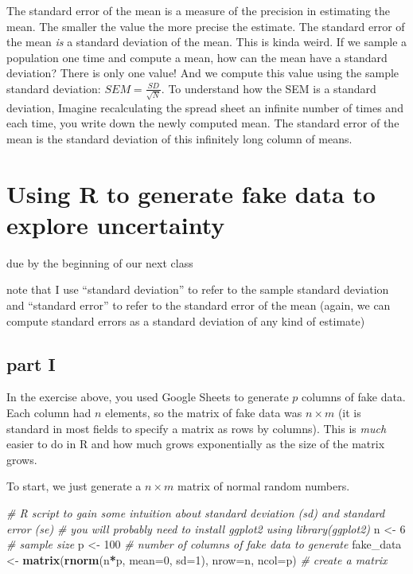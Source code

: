 \documentclass[]{book}
\newenvironment{Shaded}{\begin{snugshade}}{\end{snugshade}}
\newcommand{\KeywordTok}[1]{\textcolor[rgb]{0.13,0.29,0.53}{\textbf{#1}}}
\newcommand{\DataTypeTok}[1]{\textcolor[rgb]{0.13,0.29,0.53}{#1}}
\newcommand{\DecValTok}[1]{\textcolor[rgb]{0.00,0.00,0.81}{#1}}
\newcommand{\StringTok}[1]{\textcolor[rgb]{0.31,0.60,0.02}{#1}}
\newcommand{\CommentTok}[1]{\textcolor[rgb]{0.56,0.35,0.01}{\textit{#1}}}
\newcommand{\OperatorTok}[1]{\textcolor[rgb]{0.81,0.36,0.00}{\textbf{#1}}}
\newcommand{\NormalTok}[1]{#1}
\theoremstyle{definition}
\theoremstyle{definition}
\theoremstyle{definition}
\theoremstyle{remark}
\begin{document}
The standard error of the mean is a measure of the precision in
estimating the mean. The smaller the value the more precise the
estimate. The standard error of the mean \emph{is} a standard deviation
of the mean. This is kinda weird. If we sample a population one time and
compute a mean, how can the mean have a standard deviation? There is
only one value! And we compute this value using the sample standard
deviation: \(SEM = \frac{SD}{\sqrt{N}}\). To understand how the SEM is a
standard deviation, Imagine recalculating the spread sheet an infinite
number of times and each time, you write down the newly computed mean.
The standard error of the mean is the standard deviation of this
infinitely long column of means.

\section{Using R to generate fake data to explore
uncertainty}\label{using-r-to-generate-fake-data-to-explore-uncertainty}

due by the beginning of our next class

note that I use ``standard deviation'' to refer to the sample standard
deviation and ``standard error'' to refer to the standard error of the
mean (again, we can compute standard errors as a standard deviation of
any kind of estimate)

\subsection{part I}\label{part-i}

In the exercise above, you used Google Sheets to generate \(p\) columns
of fake data. Each column had \(n\) elements, so the matrix of fake data
was \(n \times m\) (it is standard in most fields to specify a matrix as
rows by columns). This is \emph{much} easier to do in R and how much
grows exponentially as the size of the matrix grows.

To start, we just generate a \(n \times m\) matrix of normal random
numbers.

\begin{Shaded}
\begin{Highlighting}[]
\CommentTok{# R script to gain some intuition about standard deviation (sd) and standard error (se)}
\CommentTok{# you will probably need to install ggplot2 using library(ggplot2) }
\NormalTok{n <-}\StringTok{ }\DecValTok{6} \CommentTok{# sample size}
\NormalTok{p <-}\StringTok{ }\DecValTok{100} \CommentTok{# number of columns of fake data to generate}
\NormalTok{fake_data <-}\StringTok{ }\KeywordTok{matrix}\NormalTok{(}\KeywordTok{rnorm}\NormalTok{(n}\OperatorTok{*}\NormalTok{p, }\DataTypeTok{mean=}\DecValTok{0}\NormalTok{, }\DataTypeTok{sd=}\DecValTok{1}\NormalTok{), }\DataTypeTok{nrow=}\NormalTok{n, }\DataTypeTok{ncol=}\NormalTok{p) }\CommentTok{# create a matrix}
\end{Highlighting}
\end{Shaded}
\end{document}
